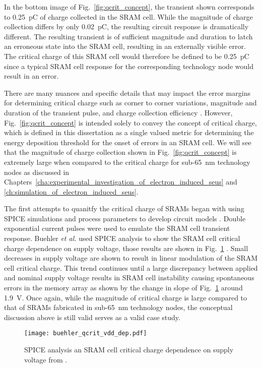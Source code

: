 In the bottom image of Fig.~\ref{fig:qcrit_concept}, the transient shown corresponds to 0.25~pC of charge collected in the SRAM cell. 
While the magnitude of charge collection differs by only 0.02~pC, the resulting circuit response is dramatically different. 
The resulting transient is of sufficient magnitude and duration to latch an erroneous state into the SRAM cell, resulting in an externally visible error.
The critical charge of this SRAM cell would therefore be defined to be 0.25~pC since a typical SRAM cell response for the corresponding technology node  would result in an error.

There are many nuances and specific details that may impact the error margins for determining critical charge such as corner to corner variations, magnitude and duration of the transient pulse, and charge collection efficiency \cite{Warren:2007vm,Warren:2007ca,kauppila2009bias,kauppila2011pvsram,kauppila2011pvcs}. 
However, Fig.~\ref{fig:qcrit_concept} is intended solely to convey the concept of critical charge, which is defined in this dissertation as a single valued metric for determining the energy deposition threshold for the onset of errors in an SRAM cell.
We will see that the magnitude of charge collection shown in Fig.~\ref{fig:qcrit_concept} is extremely large when compared to the critical charge for sub-65~nm technology nodes as discussed in Chapters~\ref{cha:experimental_investigation_of_electron_induced_seus} and \ref{ch:simulation_of_electron_induced_seus}.

The first attempts to quanitfy the critical charge of SRAMs began with using SPICE simulations and process parameters to develop circuit models \cite{buehler1990alpha,roth1993monitoring}.
Double exponential current pulses were used to emulate the SRAM cell transient response.
Buehler \emph{et al.} used SPICE analysis to show the SRAM cell critical charge dependence on supply voltage, those results are shown in Fig.~\ref{fig:qcrit_vdd_dep} \cite{buehler1990alpha}.
Small decreases in supply voltage are shown to result in linear modulation of the SRAM cell critical charge.
This trend continues until a large discrepancy between applied and nominal supply voltage results in SRAM cell instability causing spontaneous errors in the memory array as shown by the change in slope of Fig.~\ref{fig:qcrit_vdd_dep} around 1.9~V.
Once again, while the magnitude of critical charge is large compared to that of SRAMs fabricated in sub-65~nm technology nodes, the conceptual discussion above is still valid serves as a valid case study.
\begin{figure}[tb]
    \begin{center}
        \texttt{[image: buehler\_qcrit\_vdd\_dep.pdf]}
    \end{center}
    \caption[SPICE analysis of the critical charge dependence on supply voltage]
    {SPICE analysis an SRAM cell critical charge dependence on supply voltage from \cite{buehler1990alpha}.}
    \label{fig:qcrit_vdd_dep}
\end{figure}

